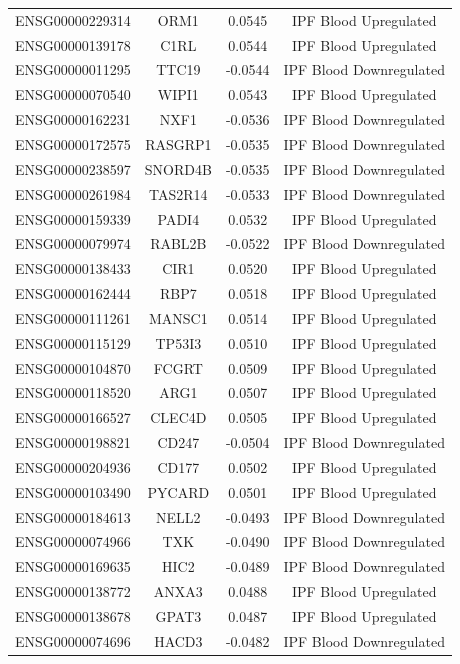 \documentclass[
]{article}
\begin{document}
\begin{singlespace}
\begin{longtable}[t]{lccc}
ENSG00000229314 & ORM1 & 0.0545 & IPF Blood Upregulated\\
ENSG00000139178 & C1RL & 0.0544 & IPF Blood Upregulated\\
ENSG00000011295 & TTC19 & -0.0544 & IPF Blood Downregulated\\
\addlinespace
ENSG00000070540 & WIPI1 & 0.0543 & IPF Blood Upregulated\\
ENSG00000162231 & NXF1 & -0.0536 & IPF Blood Downregulated\\
ENSG00000172575 & RASGRP1 & -0.0535 & IPF Blood Downregulated\\
ENSG00000238597 & SNORD4B & -0.0535 & IPF Blood Downregulated\\
ENSG00000261984 & TAS2R14 & -0.0533 & IPF Blood Downregulated\\
\addlinespace
ENSG00000159339 & PADI4 & 0.0532 & IPF Blood Upregulated\\
ENSG00000079974 & RABL2B & -0.0522 & IPF Blood Downregulated\\
ENSG00000138433 & CIR1 & 0.0520 & IPF Blood Upregulated\\
ENSG00000162444 & RBP7 & 0.0518 & IPF Blood Upregulated\\
ENSG00000111261 & MANSC1 & 0.0514 & IPF Blood Upregulated\\
\addlinespace
ENSG00000115129 & TP53I3 & 0.0510 & IPF Blood Upregulated\\
ENSG00000104870 & FCGRT & 0.0509 & IPF Blood Upregulated\\
ENSG00000118520 & ARG1 & 0.0507 & IPF Blood Upregulated\\
ENSG00000166527 & CLEC4D & 0.0505 & IPF Blood Upregulated\\
ENSG00000198821 & CD247 & -0.0504 & IPF Blood Downregulated\\
\addlinespace
ENSG00000204936 & CD177 & 0.0502 & IPF Blood Upregulated\\
ENSG00000103490 & PYCARD & 0.0501 & IPF Blood Upregulated\\
ENSG00000184613 & NELL2 & -0.0493 & IPF Blood Downregulated\\
ENSG00000074966 & TXK & -0.0490 & IPF Blood Downregulated\\
ENSG00000169635 & HIC2 & -0.0489 & IPF Blood Downregulated\\
\addlinespace
ENSG00000138772 & ANXA3 & 0.0488 & IPF Blood Upregulated\\
ENSG00000138678 & GPAT3 & 0.0487 & IPF Blood Upregulated\\
ENSG00000074696 & HACD3 & -0.0482 & IPF Blood Downregulated\\

\end{longtable}
\end{singlespace}
\end{document}
